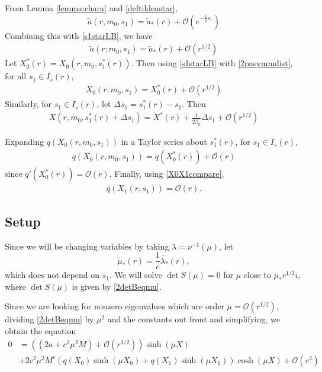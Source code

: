 \documentclass[thesis.tex]{subfiles}
\begin{document}
From Lemma \ref{lemma:chara} and \cref{deftildeastar},
\[
\tilde{a}(r, m_0, s_1) = \tilde{a}_*(r) + \mathcal{O}\left( e^{-\frac{1}{\rho}s_1} \right)
\]
Combining this with \cref{s1starLB}, we have
\begin{align}\label{tildeasub}
\tilde{a}(r; m_0, s_1) = \tilde{a}_*(r) + \mathcal{O}\left( r^{1/2} \right)
\end{align}
Let $X_0^*(r) = X_0(r, m_0, s_1^*(r))$. Then using \cref{s1starLB} with \cref{2pasymmdist}, for all $s_1 \in I_s(r)$,
\begin{align}\label{X0sub}
X_0(r, m_0, s_1) = X_0^*(r) + \mathcal{O}\left( r^{1/2} \right)
\end{align}
Similarly, for $s_1 \in I_s(r)$, let $\Delta s_1 = s_1^*(r) - s_1$. Then 
\begin{align}\label{Xsub}
X(r, m_0, s_1^*(r) + \Delta s_1) = X^*(r) + \frac{1}{2\beta_0}\Delta s_1 + \mathcal{O}\left( r^{1/2} \right)
\end{align}

Expanding $q(X_0(r, m_0, s_1))$ in a Taylor series about $s_1^*(r)$, for $s_1 \in I_s(r)$,
\begin{align}\label{qX0sub}
q( X_0(r, m_0, s_1) ) = q(X_0^*(r)) + \mathcal{O}\left(r \right)
\end{align}
since $q'(X_0^*(r)) = \mathcal{O}(r)$. Finally, using \cref{X0X1compare},
\begin{align}\label{qX1bound}
q(X_1(r, s_1)) = \mathcal{O}(r).
\end{align}

\subsection{Setup}

Since we will be changing variables by taking $\lambda = \nu^{-1}(\mu)$, let 
\begin{equation}\label{Kreinmustar1}
\tilde{\mu}_*(r) = \frac{1}{c} \tilde{\lambda_*}(r),
\end{equation}
which does not depend on $s_1$. We will solve $\det S(\mu) = 0$ for $\mu$ close to $\tilde{\mu}_* r^{1/2} i$, where $\det S(\mu)$ is given by \cref{2detBeqmu}.

Since we are looking for nonzero eigenvalues which are order $\mu = \mathcal{O}(r^{1/2})$, dividing \cref{2detBeqmu} by $\mu^2$ and the constants out front and simplifying, we obtain the equation
\begin{equation}\label{KreinB1}
\begin{aligned}
0 &= \left( (2a + c^2 \mu^2 M) + \mathcal{O}( r^{3/2} )\right) \sinh(\mu X) \\
&+ 2 c^2 \mu^2 M^c ( q(X_0) \sinh(\mu X_0) + q(X_1) \sinh(\mu X_1) ) \cosh(\mu X) + \mathcal{O}( r^2 ) 
\end{aligned}
\end{equation}
\end{document}
